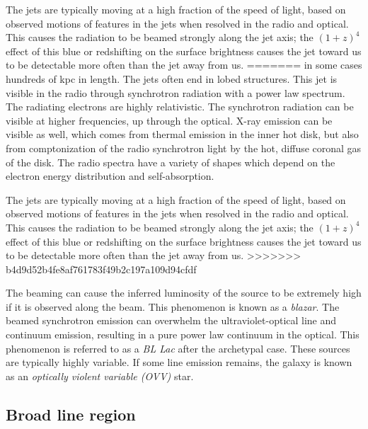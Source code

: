 The jets are typically moving at a high fraction of the speed of
light, based on observed motions of features in the jets when resolved
in the radio and optical. This causes the radiation to
be beamed strongly along the jet axis; the $(1+z)^4$ effect of this
blue or redshifting on the surface brightness causes the jet toward us
to be detectable more often than the jet away from us.
=======
in some cases hundreds of kpc in length.  The jets often end in lobed
structures.  This jet is visible in the radio through synchrotron
radiation with a power law spectrum. The radiating electrons are
highly relativistic. The synchrotron radiation can be visible at
higher frequencies, up through the optical.  X-ray emission can be
visible as well, which comes from thermal emission in the inner hot
disk, but also from comptonization of the radio synchrotron light by
the hot, diffuse coronal gas of the disk. The radio spectra have a
variety of shapes which depend on the electron energy distribution and
self-absorption.

The jets are typically moving at a high fraction of the speed of
light, based on observed motions of features in the jets when resolved
in the radio and optical. This causes the radiation to be beamed
strongly along the jet axis; the $(1+z)^4$ effect of this blue or
redshifting on the surface brightness causes the jet toward us to be
detectable more often than the jet away from us.
>>>>>>> b4d9d52b4fe8af761783f49b2c197a109d94cfdf

The beaming can cause the inferred luminosity of the source to be
extremely high if it is observed along the beam. This phenomenon is
known as a {\it blazar}. The beamed synchrotron emission can overwhelm
the ultraviolet-optical line and continuum emission, resulting in a
pure power law continuum in the optical. This phenomenon is referred
to as a {\it BL Lac} after the archetypal case. These sources are
typically highly variable. If some line emission remains, the galaxy
is known as an {\it optically violent variable (OVV)} star.

\subsection{Broad line region}

